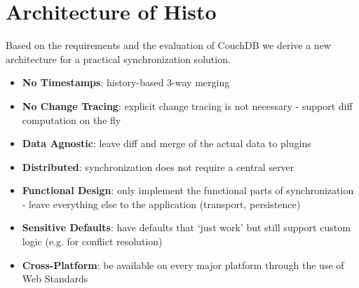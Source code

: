 
\section{Architecture of Histo}
\label{sec:main.histo}

Based on the requirements and the evaluation of CouchDB we derive a new architecture for a practical synchronization solution.

\begin{itemize}
\item
  \textbf{No Timestamps}: history-based 3-way merging
\item
  \textbf{No Change Tracing}: explicit change tracing is not necessary - support
  diff computation on the fly
\item
  \textbf{Data Agnostic}: leave diff and merge of the actual data to
  plugins
\item
  \textbf{Distributed}: synchronization does not require a central server
\item
  \textbf{Functional Design}: only implement the functional parts of synchronization - leave everything else to the application (transport, persistence)
\item
  \textbf{Sensitive Defaults}: have defaults that `just work' but
  still support custom logic (e.g. for conflict resolution)
\item
  \textbf{Cross-Platform}: be available on every major platform through the use of Web Standards
\end{itemize}

